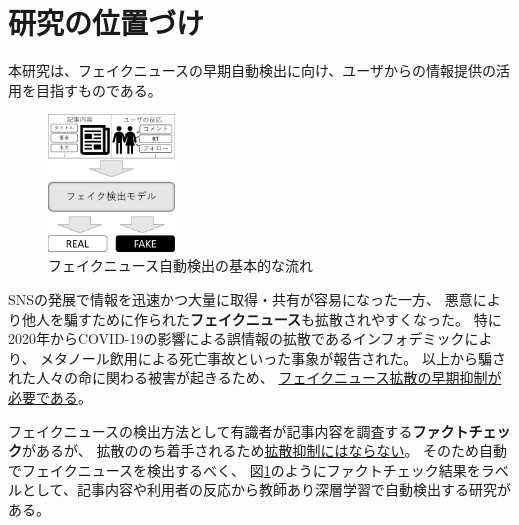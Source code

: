 
\section{研究の位置づけ}

本研究は、フェイクニュースの早期自動検出に向け、ユーザからの情報提供の活用を目指すものである。


\setlength\intextsep{0pt}
\setlength\textfloatsep{0pt}
\begin{figure}
    \centering
    \includegraphics[width=0.3\textwidth]{figs/base_model.pdf}
    \vspace{-1cm} 
    \caption{フェイクニュース自動検出の基本的な流れ}
    \label{fig:objects}
\end{figure}
SNSの発展で情報を迅速かつ大量に取得・共有が容易になった一方、
悪意により他人を騙すために作られた\textbf{フェイクニュース}も拡散されやすくなった。
特に2020年からCOVID-19の影響による誤情報の拡散であるインフォデミックにより、
メタノール飲用による死亡事故\cite{iraninfo}といった事象が報告された。
以上から騙された人々の命に関わる被害が起きるため、
\underline{フェイクニュース拡散の早期抑制が必要である}\cite{snsinfo}。

フェイクニュースの検出方法として有識者が記事内容を調査する\textbf{ファクトチェック}があるが、
拡散ののち着手されるため\underline{拡散抑制にはならない}。
そのため自動でフェイクニュースを検出するべく、
図\ref{fig:objects}のようにファクトチェック結果をラベルとして、記事内容や利用者の反応から教師あり深層学習で自動検出する研究がある\cite{Wang:2018:EEA:3219819.3219903}。

